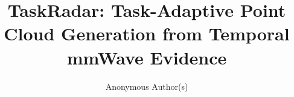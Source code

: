 \title[TaskRadar: Task-Adaptive Radar Point Generation]{TaskRadar: Task-Adaptive Point Cloud Generation from Temporal mmWave Evidence}
\author{Anonymous Author(s)}
\renewcommand{\shortauthors}{Anonymous Author(s)}
